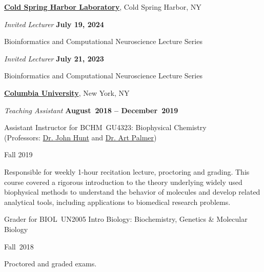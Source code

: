 \documentclass[10pt]{article}
\newcommand{\halfblankline}{\quad\vspace{-0.5\baselineskip}\pagebreak[3]}
\begin{document}
	\href{https://www.cshl.edu/}{\textbf{Cold Spring Harbor Laboratory}}, Cold Spring Harbor, NY
	\begin{outerlist}

		\item[] \textit{Invited Lecturer}%
		\hfill \textbf{July 19, 2024}
		\begin{innerlist}
			\item Bioinformatics and Computational Neuroscience Lecture Series
		\end{innerlist}
	
		\item[] \textit{Invited Lecturer}%
		\hfill \textbf{July 21, 2023}
		\begin{innerlist}
			\item Bioinformatics and Computational Neuroscience Lecture Series
		\end{innerlist}
	\end{outerlist}
		
	\halfblankline
	
	
	\href{http://www.columbia.edu/}{\textbf{Columbia University}},
	New York, NY
	\begin{outerlist}
		
		\item[] \textit{Teaching Assistant}%
		\hfill \textbf{August~2018 -- December~2019}
		\begin{innerlist}
			\item Assistant Instructor for BCHM~GU4323: Biophysical Chemistry\\(Professors: \href{https://www.biology.columbia.edu/people/hunt} {Dr. John Hunt} and \href{https://www.biochem.cuimc.columbia.edu/research-labs/palmer-lab} {Dr. Art Palmer})
			\begin{innerlist}
				\item Fall 2019
				\item Responsible for weekly 1-hour recitation lecture, proctoring and grading. This course covered a rigorous introduction to the theory underlying widely used biophysical methods to understand the behavior of molecules and develop related analytical tools, including applications to biomedical research problems.
			\end{innerlist}
			
			\halfblankline
			
			\item Grader for BIOL~UN2005 Intro Biology: Biochemistry, Genetics \& Molecular Biology
			\begin{innerlist}
				\item Fall~2018
				\item Proctored and graded exams.
			\end{innerlist}
			
			\halfblankline
			
		\end{innerlist}
	\end{outerlist}
\end{document}
